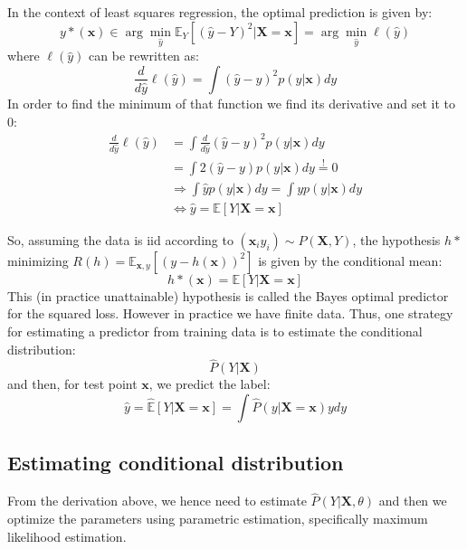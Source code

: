 \documentclass[a4paper,10pt,twoside]{article}
\begin{document}
In the context of least squares regression, the optimal prediction is given by:
\begin{equation*}
    y*(\mathbf{x})\in\arg\min_{\hat{y}}\mathbb{E}_{Y}[(\hat{y}-Y)^2|\mathbf{X}=\mathbf{x}]=\arg\min_{\hat{y}}\ell(\hat{y})
\end{equation*}
where $\ell(\hat{y})$ can be rewritten as:
\begin{equation*}
    \frac{d}{d\hat{y}}\ell(\hat{y}) = \int(\hat{y}-y)^2p(y|\mathbf{x})dy
\end{equation*}
In order to find the minimum of that function we find its derivative and set it to 0:
\begin{align*}
    \frac{d}{d\hat{y}}\ell(\hat{y}) &= \int \frac{d}{d\hat{y}}(\hat{y}-y)^2p(y|\mathbf{x})dy \\
    &= \int 2(\hat{y}-y)p(y|\mathbf{x})dy\overset{!}{=} 0\\
    &\Rightarrow\int\hat{y}p(y|\mathbf{x})dy=\int yp(y|\mathbf{x})dy \\
    &\Leftrightarrow \hat{y}=\mathbb{E}[Y|\mathbf{X}=\mathbf{x}]
\end{align*}

So, assuming the data is iid according to $(\mathbf{x}_iy_i)\sim P(\mathbf{X},Y)$, the hypothesis $h*$ minimizing $R(h)=\mathbb{E}_{\mathbf{x},y}[(y-h(\mathbf{x}))^2]$ is given by the conditional mean:
\begin{equation*}
    h*(\mathbf{x})=\mathbb{E}[Y|\mathbf{X}=\mathbf{x}]
\end{equation*}
This (in practice unattainable) hypothesis is called the Bayes optimal predictor for the squared loss. However in practice we have finite data. Thus, one strategy for estimating a predictor from training data is to estimate the conditional distribution:
\begin{equation*}
    \hat{P}(Y|\mathbf{X})
\end{equation*}
and then, for test point $\mathbf{x}$, we predict the label:
\begin{equation*}
    \hat{y}= \hat{\mathbb{E}}[Y|\mathbf{X}=\mathbf{x}]=\int\hat{P}(y|\mathbf{X}=\mathbf{x})ydy
\end{equation*}

\subsection{Estimating conditional distribution}

From the derivation above, we hence need to estimate $\hat{P}(Y|\mathbf{X}, \theta)$ and then we optimize the parameters using parametric estimation, specifically maximum likelihood estimation.
\end{document}

